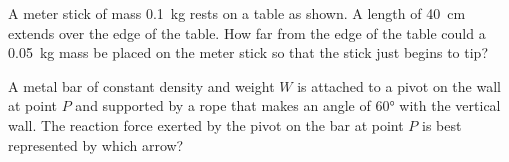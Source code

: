 \documentclass{../../oss-apphys-exam}
\begin{document}
\genheader


\genmultidirections

\gengravity

\raggedcolumns
\begin{multicols*}{2}
  \begin{questions}

    \question A meter stick of mass \SI{.1}{\kilo\gram} rests on a table as
    shown. A length of \SI{40}{\centi\metre} extends over the edge of the table.
    How far from the edge of the table could a \SI{.05}{\kilo\gram} mass be
    placed on the meter stick so that the stick just begins to tip?
    \begin{center}
    \end{center}
    
    \question A metal bar of constant density and weight $W$ is attached to a
    pivot on the wall at point $P$ and supported by a rope that makes an angle
    of \ang{60} with the vertical wall. The reaction force exerted by the pivot
    on the bar at point $P$ is best represented by which arrow?
    \begin{choices}
      \choice{\Huge$\nearrow$}
      \choice{\Huge$\uparrow$}
      \choice{\Huge$\downarrow$}
      \choice{\Huge$\nwarrow$}
      \choice{\Huge$\searrow$}
    \end{choices}
    \columnbreak
    

\end{questions}
\end{multicols*}
\end{document}
